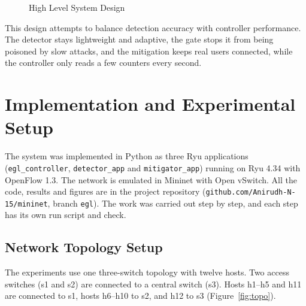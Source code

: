 \documentclass[12pt,a4paper]{article}
\begin{document}
\begin{figure}[H]
\caption{High Level System Design}
\label{fig:design}
\end{figure}

This design attempts to balance detection accuracy with controller performance.
The detector stays lightweight and adaptive, the gate stops it from being
poisoned by slow attacks, and the mitigation keeps real users connected, while
the controller only reads a few counters every second.

\newpage
\section{Implementation and Experimental Setup}
The system was implemented in Python as three Ryu applications
(\texttt{egl\_controller}, \texttt{detector\_app} and \texttt{mitigator\_app})
running on Ryu 4.34 with OpenFlow 1.3. The network is emulated in Mininet with
Open vSwitch. All the code, results and figures are in the project repository
(\texttt{github.com/Anirudh-N-15/mininet}, branch \texttt{egl}). The work was
carried out step by step, and each step has its own run script and check.

\subsection{Network Topology Setup}
The experiments use one three-switch topology with twelve hosts. Two access
switches (s1 and s2) are connected to a central switch (s3). Hosts h1--h5 and
h11 are connected to s1, hosts h6--h10 to s2, and h12 to s3
(Figure~\ref{fig:topo}).
\end{document}

